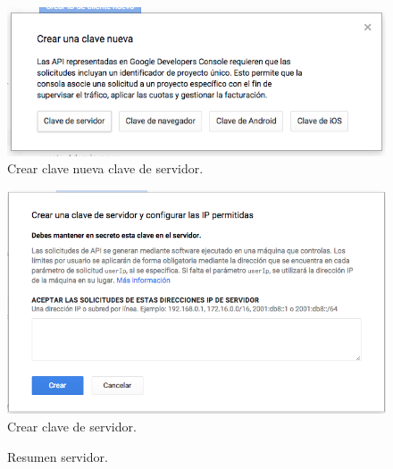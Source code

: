 \begin{figure}[H]
\centering
\includegraphics[scale=0.40]{images/capitulo5/cuentaNueva.png}
\caption{Crear clave nueva clave de servidor.}
\label{crearClaveNueva}
\end{figure}

\begin{figure}[H]
\centering
\includegraphics[scale=0.50]{images/capitulo5/crearClave.png}
\caption{Crear clave de servidor.}
\label{botonClaveNueva}
\end{figure}

\begin{figure}[H]
\centering
\setlength\fboxsep{0pt}
\setlength\fboxrule{0.5pt}
\caption{Resumen servidor.}
\label{resumenServidor}
\end{figure}

